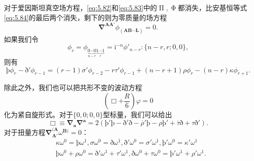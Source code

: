 对于爱因斯坦真空场方程，\ref{eq:5.82}和\ref{eq:5.83}中的$\upPi ,\upPhi $都消失，比安基恒等式\ref{eq:5.84}的最后两个消失，剩下的则为零质量的场方程
\begin{equation*}
	\boldsymbol{\nabla }^{\boldsymbol{AA} '} \phi _{(\boldsymbol{AB} \cdots \boldsymbol{L})} =0.
\end{equation*}
如果我们令
\begin{equation*}
	\phi _{r} =\phi _{\underbrace{0\cdots 0}_{n-r}\underbrace{1\cdots 1}_{r}} =\mathrm{i}^{-n} \phi '_{n-r} :\{n-r,r;0,0\} ,
\end{equation*}
则有
\begin{equation*}
	\text{þ}\phi _{r} -\text{ð} '\phi _{r-1} =( r-1) \sigma '\phi _{r-2} -r\tau '\phi _{r-1} +( n-r+1) \rho \phi _{r} -( n-r) \kappa \phi _{r+1} .
\end{equation*}


除此之外，我们也可以把共形不变的波动方程\parencite{penrose_spinors_1986}
\begin{equation*}
	\left( \Box +\frac{R}{6}\right) \varphi =0
\end{equation*}
化为紧自旋形式。对于$\{0,0;0,0\}$型标量，我们可以给出
\begin{equation*}
	\Box \equiv \boldsymbol{\nabla }_{\boldsymbol{a}}\boldsymbol{\nabla }^{\boldsymbol{a}} =2(\text{þ}'\text{þ}-\text{ð} '\text{ð} -\overline{\rho } '\text{þ}-\rho \text{þ}'+\overline{\tau } \text{ð} +\tau \text{ð} ').
\end{equation*}
对于扭量方程$\boldsymbol{\nabla }_{\boldsymbol{A} '}^{(\boldsymbol{A}} \omega ^{\boldsymbol{B})} =0$：
\begin{equation*}
	\begin{aligned}
		& \kappa \omega ^{0} =\text{þ}\omega ^{1} ,\sigma \omega ^{0} =\text{ð} \omega ^{1} ,\text{ð} '\omega ^{0} =\sigma '\omega ^{1} ,\text{þ}'\omega ^{0} =\kappa '\omega ^{1}\\
		& \text{þ}\omega ^{0} +\rho \omega ^{0} =\text{ð} '\omega ^{1} +\tau '\omega ^{1} ,\text{ð} \omega ^{0} +\tau \omega ^{0} =\text{þ}'\omega ^{1} +\rho '\omega ^{1} .
	\end{aligned}
\end{equation*}


